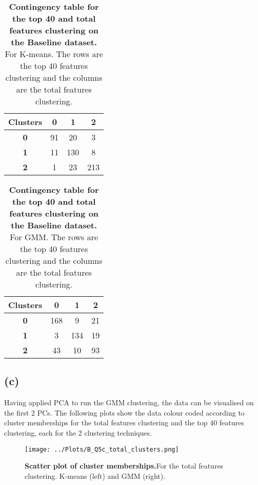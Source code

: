 \documentclass[12pt]{report} %
\begin{document}
\begin{table}[h]
    \centering
    \begin{tabular}{ |c|c|c|c| }
        \hline
        \textbf{Clusters} & \textbf{0} & \textbf{1} & \textbf{2}\\ 
        \hline
        \textbf{0} & 91 & 20 & 3\\
        \hline
        \textbf{1} & 11 & 130 & 8\\
        \hline
        \textbf{2} & 1 & 23 & 213\\
        \hline
    \end{tabular}
    \caption{\textbf{Contingency table for the top 40 and total features clustering on the Baseline dataset.} For K-means. The rows are the top 40 features clustering and the columns are the total features clustering.}
\end{table}

\begin{table}[h]
    \centering
    \begin{tabular}{ |c|c|c|c| }
        \hline
        \textbf{Clusters} & \textbf{0} & \textbf{1} & \textbf{2}\\ 
        \hline
        \textbf{0} & 168 & 9 & 21\\
        \hline
        \textbf{1} & 3 & 134 & 19\\
        \hline
        \textbf{2} & 43 & 10 & 93\\
        \hline
    \end{tabular}
    \caption{\textbf{Contingency table for the top 40 and total features clustering on the Baseline dataset.} For GMM. The rows are the top 40 features clustering and the columns are the total features clustering.}
\end{table}


\subsection*{(c)}

Having applied PCA to run the GMM clustering, the data can be visualised on the first 2 PCs. The following plots show the data colour coded according to cluster memberships for the total features clustering and the top 40 features clustering, each for the 2 clustering techniques.

\begin{figure}[htbp]
    \centering
    \texttt{[image: ../Plots/B\_Q5c\_total\_clusters.png]}
    \caption{\textbf{Scatter plot of cluster memberships.}For the total features clustering. K-means (left) and GMM (right).}
\end{figure}
\end{document}
